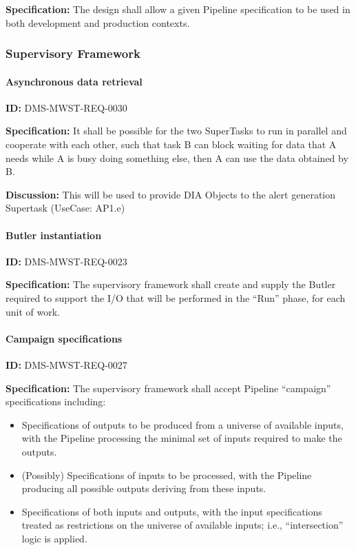 \documentclass[SE,toc,lsstdraft]{lsstdoc}
\begin{document}
\textbf{Specification:}
The design shall allow a given Pipeline specification to be used in both development and production contexts.

\subsubsection{Supervisory Framework}

\paragraph{Asynchronous data retrieval}\hfill  %

\label{DMS-MWST-REQ-0030}
\textbf{ID:} DMS-MWST-REQ-0030

\textbf{Specification:}
It shall be possible for the two SuperTasks to run in parallel and cooperate with each other, such that task B can block waiting for data that A needs while A is busy doing something else, then A can use the data obtained by B.

\textbf{Discussion:}
This will be used to provide DIA Objects to the alert generation Supertask (UseCase: AP1.e)

\paragraph{Butler instantiation}\hfill  %

\label{DMS-MWST-REQ-0023}
\textbf{ID:} DMS-MWST-REQ-0023

\textbf{Specification:}
The supervisory framework shall create and supply the Butler required to support the I/O that will be performed in the “Run” phase, for each unit of work.

\paragraph{Campaign specifications}\hfill  %

\label{DMS-MWST-REQ-0027}
\textbf{ID:} DMS-MWST-REQ-0027

\textbf{Specification:}
The supervisory framework shall accept Pipeline “campaign” specifications including:

    \begin{itemize}
\item
Specifications of outputs to be produced from a universe of available inputs, with the Pipeline processing the minimal set of inputs required to make the outputs.

\item
(Possibly) Specifications of inputs to be processed, with the Pipeline producing all possible outputs deriving from these inputs.

\item
Specifications of both inputs and outputs, with the input specifications treated as restrictions on the universe of available inputs; i.e., “intersection” logic is applied.

    \end{itemize}
\end{document}
